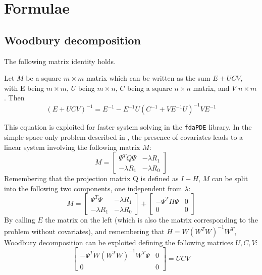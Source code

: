 \chapter{Formulae}
\section{Woodbury decomposition}
\label{sec:wood}
The following matrix identity holds.
\begin{proposition}
    Let $M$ be a square $m\times m$ matrix which can be written as the sum $E+UCV$, with E being $m \times m$, $U$ being $m\times n$, $C$ being a square $n\times n$ matrix, and $V$ $n\times m$. Then
    \begin{equation}
        \label{wood}
        (E + UCV )^{-1} = E^{-1} - E^{-1}U(C^{-1} + V E^{-1}U)^{-1}V E^{-1}
    \end{equation}
\end{proposition}
This equation is exploited for faster system solving in the \verb|fdaPDE| library.
In the simple space-only problem described \eg in \cite{sangalli}, the presence of covariates leads to a linear system involving the following matrix $M$:
\begin{equation*}
    M =
    \begin{bmatrix}
        \Psi^TQ\Psi & -\lambda R_1\\
        -\lambda R_1  & -\lambda R_0
    \end{bmatrix}
\end{equation*}
Remembering that the projection matrix Q is defined as $I-H$, $M$ can be split into the following two components, one independent from $\lambda$:
\begin{equation*}
    M =
    \begin{bmatrix}
        \Psi^T\Psi & -\lambda R_1\\
        -\lambda R_1  & -\lambda R_0
    \end{bmatrix}
    +
    \begin{bmatrix}
        -\Psi^TH\Psi & 0\\
        0 & 0
    \end{bmatrix}
\end{equation*}
By calling $E$ the matrix on the left (which is also the matrix corresponding to the problem without covariates), and remembering that $H = W(W^TW)^{-1}W^T$, Woodbury decomposition can be exploited defining the following matrices $U, C, V$:
\begin{equation*}     
    \begin{bmatrix}
        -\Psi^TW(W^TW)^{-1}W^T\Psi & 0\\
        0 & 0
    \end{bmatrix} = UCV
\end{equation*}
